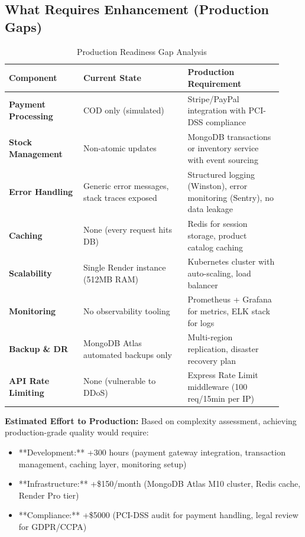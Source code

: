 \documentclass[12pt, a4paper]{report}
\begin{document}
\subsection{What Requires Enhancement (Production Gaps)}

\begin{table}[H]
\centering
\caption{Production Readiness Gap Analysis}
\label{tab:production_gaps}
\small
\begin{tabular}{@{}p{0.25\linewidth}p{0.35\linewidth}p{0.32\linewidth}@{}}
\toprule
\textbf{Component} & \textbf{Current State} & \textbf{Production Requirement} \\
\midrule
\textbf{Payment Processing} & COD only (simulated) & Stripe/PayPal integration with PCI-DSS compliance \\
\textbf{Stock Management} & Non-atomic updates & MongoDB transactions or inventory service with event sourcing \\
\textbf{Error Handling} & Generic error messages, stack traces exposed & Structured logging (Winston), error monitoring (Sentry), no data leakage \\
\textbf{Caching} & None (every request hits DB) & Redis for session storage, product catalog caching \\
\textbf{Scalability} & Single Render instance (512MB RAM) & Kubernetes cluster with auto-scaling, load balancer \\
\textbf{Monitoring} & No observability tooling & Prometheus + Grafana for metrics, ELK stack for logs \\
\textbf{Backup \& DR} & MongoDB Atlas automated backups only & Multi-region replication, disaster recovery plan \\
\textbf{API Rate Limiting} & None (vulnerable to DDoS) & Express Rate Limit middleware (100 req/15min per IP) \\
\bottomrule
\end{tabular}
\end{table}

\textbf{Estimated Effort to Production:} Based on complexity assessment, achieving production-grade quality would require:
\begin{itemize}
    \item **Development:** +300 hours (payment gateway integration, transaction management, caching layer, monitoring setup)
    \item **Infrastructure:** +\$150/month (MongoDB Atlas M10 cluster, Redis cache, Render Pro tier)
    \item **Compliance:** +\$5000 (PCI-DSS audit for payment handling, legal review for GDPR/CCPA) 
\end{itemize}
\end{document}
